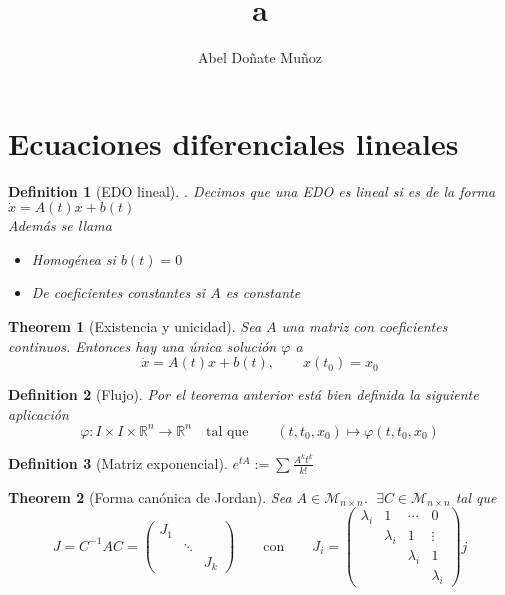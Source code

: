 \documentclass[leqno]{article}
\title{a}
\author{Abel Doñate Muñoz}
\date{}
\newtheorem*{theorem}{Theorem}
\newtheorem*{definition}{Definition}
\begin{document}
\maketitle
\tableofcontents
\newpage

\section{Ecuaciones diferenciales lineales}
\begin{definition}[EDO lineal]. Decimos que una  EDO es lineal si es de la forma $\dot{x} = A(t)x + b(t)$ \\
  Además se llama
  \begin{itemize}[topsep=-6pt, itemsep=0pt]
    \item Homogénea si $b(t) = 0$
    \item De coeficientes constantes si $A$ es constante
  \end{itemize}

\end{definition}

\begin{theorem}[Existencia y unicidad] Sea  $A$ una matriz con coeficientes continuos. Entonces hay una única solución $\varphi$ a
  \[
  \dot{x} = A(t)x + b(t), \qquad x(t_0) = x_0
  \] 
\end{theorem}

\begin{definition}[Flujo] Por el teorema anterior está bien definida la siguiente aplicación
  \[
  \varphi : I \times I \times \mathbb{R}^n \to  \mathbb{R}^n \quad \text{tal que} \qquad (t, t_0, x_0) \mapsto \varphi (t, t_0, x_0)
  \] 

\end{definition}

\begin{definition}[Matriz exponencial] $\displaystyle e^{tA}:= \sum \frac{A^kt^k}{k!}$
\end{definition}

\begin{theorem}[Forma canónica de Jordan] Sea $A \in \mathcal{M}_{n\times n}$. $\ \exists C\in \mathcal{M}_{n\times n}$ tal que
  \[
	J = C^{-1}AC = \begin{pmatrix} J_1 & & \\ & \ddots & \\ & & J_k \end{pmatrix}   \qquad \text{con} \qquad J_i =  \begin{pmatrix} \lambda_i & 1 & \cdots & 0 \\ & \lambda_i & 1 & \vdots \\ & & \lambda_i & 1 \\ & & & \lambda_i \end{pmatrix}  j
  \] 
\end{theorem}
\end{document}
